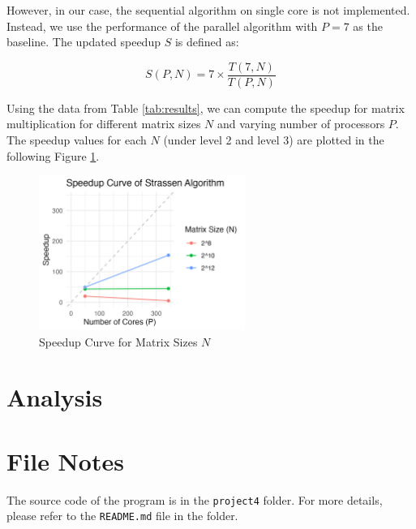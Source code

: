 \documentclass[12pt,a4paper]{article}
\begin{document}
However, in our case, the sequential algorithm on single core is not implemented. Instead, 
 we use the performance of the parallel algorithm with \( P = 7 \) as the baseline.
The updated speedup \( S \) is defined as:

\begin{equation}
    \label{eqn:updated_speedup}
    S(P, N) = 7 \times \frac{T(7,N)}{T(P, N)}
\end{equation}


 Using the data from Table \ref{tab:results}, 
  we can compute the speedup for matrix multiplication for different 
  matrix sizes \( N \) and varying number of processors \( P \). 
The speedup values for each \( N \) (under level 2 and level 3) are plotted in the following Figure \ref{fig:speedup_curve}.

\begin{figure}
    \centering
    \includegraphics[width=0.6\textwidth]{speedup_curve.png}
    \caption{Speedup Curve for Matrix Sizes \( N \)}
    \label{fig:speedup_curve}
\end{figure}
    


\section{Analysis}


\appendix
\label{app:myappendix}

\section*{File Notes}
The source code of the program is in the \texttt{project4} folder. 
For more details, please refer to the \texttt{README.md} file in the folder.
\end{document}
